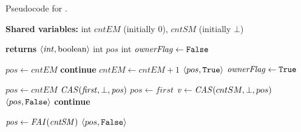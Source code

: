 \begin{algorithm}[t]
    \footnotesize
    \caption{Pseudocode for \NextIndex.}
    \label{alg:counter}
    \begin{algorithmic}[1]

        \State \textbf{Shared variables:}
        \State int $\mathit{cntEM}$ (initially $0$), $\mathit{cntSM}$ (initially $\bot$)

        \vspace{2mm}

         \textbf{returns} $\langle \mathit{int, \mbox{boolean}} \rangle$
            \State int $\mathit{pos}$
            \State int $\mathit{ownerFlag} \gets \mbox{\texttt{False}}$
            
            \While{\True}
                 \label{alg:co:em}
                    \State $\mathit{pos} \gets \mathit{cntEM}$ \label{alg:co:em:acquire-pos}
                        \State \textbf{continue} \label{alg:co:em:continue1}
                    \EndIf
                    \State $\mathit{cntEM} \gets \mathit{cntEM}+1$ \label{alg:co:em:inc-elements}
                        \State \Return $\langle pos, \mbox{\texttt{True}} \rangle$ \label{alg:co:em:checkh1}
                    \EndIf
                    \State $\mathit{ownerFlag} \gets \mbox{\texttt{True}}$ \label{alg:co:em:ownerFlag}
                \EndIf

                 \label{alg:co:em:elements-bot}
                     \label{alg:co:em:ifHelper}
                        \State $\mathit{pos} \gets \mathit{cntEM}$ \label{alg:co:em:ownerFlag1}
                        \State $\mathit{\mbox{\textit{CAS}}(first, \bot, pos)}$ \label{alg:co:em:casfirst}
                        \State $\mathit{pos} \gets first$ \label{alg:co:em:pos2}
                    \EndIf
                    \State $\mathit{v} \gets \mbox{\textit{CAS}}(cntSM, \bot, pos)$ \label{alg:co:em:cntSM-init}
                        \State \Return $\langle pos, \mbox{\texttt{False}} \rangle$ \label{alg:co:em:ifOwner}
                        \State \textbf{continue} \label{alg:co:em:continue2}
                    \EndIf
                \EndIf

                \State $\mathit{pos} \gets \mbox{\textit{FAI}}(\mathit{cntSM})$ \label{alg:co:FAI-pos}
                \State \Return $\langle pos, \mbox{\texttt{False}} \rangle$ \label{alg:co:em:return}
            \EndWhile

        \EndFunction

    \end{algorithmic}
\end{algorithm}